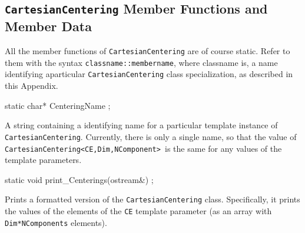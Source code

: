 \subsection{\texttt{CartesianCentering} Member Functions and Member Data} 
All the member functions of \texttt{CartesianCentering} are of course static. Refer to them with the syntax \texttt{classname::membername}, where classname is, a name identifying aparticular \texttt{CartesianCentering} 
class specialization, as described in this Appendix. 

\begin{smallcode}
static char* CenteringName ;
\end{smallcode}
A string containing a identifying name for a particular template instance of\\  \texttt{CartesianCentering}. Currently, there is only a single name, so that the value of 
\texttt{CartesianCentering<CE,Dim,NComponent> }is the same for any values of the template parameters. 

\begin{smallcode}
static void print_Centerings(ostream&) ;
\end{smallcode}
Prints a formatted version of the \texttt{CartesianCentering} class. Specifically, it prints the values of the elements of the \texttt{CE} template parameter (as an array with \texttt{Dim*NComponents} elements).

























